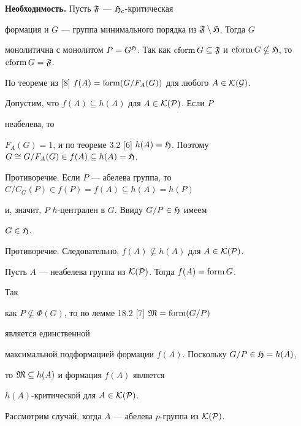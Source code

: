  


\begin{pf} 


{\bf Необходимость.} Пусть $\frak F$ --- $\frak H_c$-критическая 


формация и $G$ --- группа минимального порядка из $\frak 


F\setminus\frak H$. Тогда $G$ 


монолитична с монолитом $P=G^{\frak H}$. Так как $\cform 


G\subseteq\frak F$ и $\cform G\nsubseteq\frak H$, то $\cform G=\frak 


F$. 


По теореме из [8] $f(A)=\operatorname{form}(G/F_A(G))$ для любого $A\in\cal K(G)$. 


 


Допустим, что $f(A)\subseteq h(A)$ для $A\in\cal K(P)$. Если $P$


неабелева, то 


$F_A(G)=1$, и по теореме 3.2 [6] $h(A)=\frak H$. Поэтому $G\cong 


G/F_A(G)\in f(A)\subseteq h(A)=\frak H$. 


Противоречие. Если $P$ --- абелева группа, то $C/C_G(P)\in 


f(P)=f(A)\subseteq h(A)=h(P)$ 


и, значит, $P$\; $h$-централен в $G$. Ввиду $G/P\in\frak H$ имеем 


$G\in\frak H$. 


Противоречие. Следовательно, $f(A)\nsubseteq h(A)$ для $A\in\cal 


K(P)$. 


 


Пусть $A$ --- неабелева группа из $\cal K(P)$. Тогда $f(A)=\operatorname{form} G$. 


Так 


как $P\nsubseteq\Phi(G)$, то по лемме 18.2 [7] $\frak M=\operatorname{form}(G/P)$ 


является единственной 


максимальной подформацией формации $f(A)$. Поскольку $G/P\in\frak 


H=h(A)$, 


то $\frak M\subseteq h(A)$ и формация $f(A)$ является 


$h(A)$-критической для $A\in\cal K(P)$. 


 


Рассмотрим случай, когда $A$ --- абелева $p$-группа из $\cal K(P)$. 



\end{pf}
